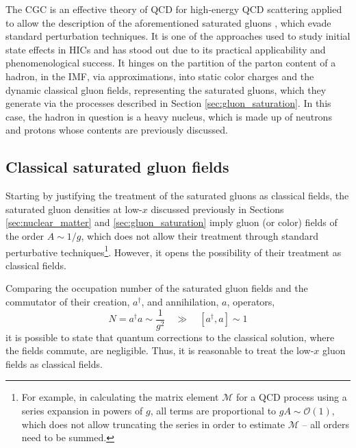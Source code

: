The \gls{CGC} is an effective theory of \gls{QCD} for high-energy \gls{QCD} scattering applied to allow the description of the aforementioned saturated gluons \cite{Gelis_2010}, which evade standard perturbation techniques. It is one of the approaches used to study initial state effects in \glspl{HIC} and has stood out due to its practical applicability and phenomenological success.\cite{Albacete_2014} It hinges on the partition of the parton content of a hadron, in the \gls{IMF},
via approximations, into static color charges and the dynamic classical gluon fields, representing the saturated gluons, which they generate via the processes described in Section \ref{sec:gluon_saturation}.\cite{Gelis_2010} In this case, the hadron in question is a heavy nucleus, which is made up of neutrons and protons whose contents are previously discussed.


\subsection{Classical saturated gluon fields}

Starting by justifying the treatment of the saturated gluons as classical fields, the saturated gluon densities at low-$x$ discussed previously in Sections \ref{sec:nuclear_matter} and \ref{sec:gluon_saturation} imply gluon (or color) fields of the order $A \sim 1/g$, which does not allow their treatment through standard perturbative techniques\footnote{For example, in calculating the matrix element $\mathcal{M}$ for a \gls{QCD} process using a series expansion in powers of $g$, all terms are proportional to $gA \sim \mathcal{O}(1)$, which does not allow truncating the series in order to estimate $\mathcal{M}$ -- all orders need to be summed.}.\cite{Albacete_2014} However, it opens the possibility of their treatment as classical fields.

Comparing the occupation number of the saturated gluon fields and the commutator of their creation, $a^\dagger$, and annihilation, $a$, operators, \cite{Albacete_2014}
\begin{equation}
	N = a^\dagger a \sim \frac{1}{g^2} \quad \gg \quad [a^\dagger, a] \sim 1
\end{equation}
it is possible to state that quantum corrections to the classical solution, where the fields commute, are negligible. Thus, it is reasonable to treat the low-$x$ gluon fields as classical fields.

